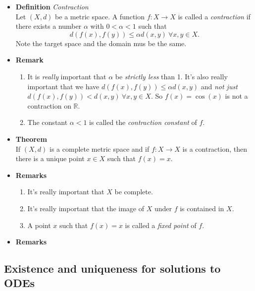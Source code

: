 \documentclass[11pt,a4paper]{article}
\begin{document}
\begin{itemize}
    \item \textbf{Definition} \emph{Contraction} \\
        Let $(X, d)$ be a metric space.
        A function $f : X \to X$ is called a \emph{contraction} if there exists a number
        $\alpha$ with $0 < \alpha < 1$ such that
        \[
            d(f(x), f(y)) \leq \alpha d(x, y) \ \forall x, y \in X.
        \]
        Note the target space and the domain mus be the same.

    \item \textbf{Remark} \\
        \begin{enumerate}
            \item It is \emph{really} important that $\alpha$ be \emph{strictly less} than 1.
                It's also really important that we have $d(f(x), f(y)) \leq \alpha d(x, y)$
                and \emph{not just} $d(f(x), f(y)) < d(x, y) \ \forall x, y \in X$.
                So $f(x) = \cos(x)$ is not a contraction on $\mathbb{R}$.
            \item The constant $\alpha < 1$ is called the \emph{contraction constant} of $f$.
        \end{enumerate}

    \item \textbf{Theorem} \\
        If $(X, d)$ is a complete metric space and if $f : X \to X$ is a contraction,
        then there is a unique point $x \in X$ such that $f(x) = x$.

    \item \textbf{Remarks}
        \begin{enumerate}
            \item It's really important that $X$ be complete.
            \item It's really important that the image of $X$ under $f$ is contained in $X$.
            \item A point $x$ such that $f(x) = x$ is called a \emph{fixed point} of $f$.
        \end{enumerate}

    \item \textbf{Remarks}

\end{itemize}

\subsection{Existence and uniqueness for solutions to ODEs}
\end{document}
